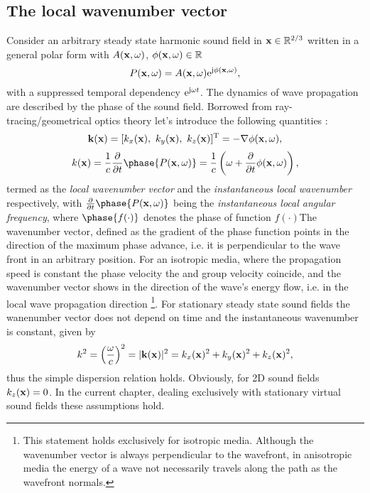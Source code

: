 \subsection{The local wavenumber vector}
Consider an arbitrary steady state harmonic sound field in $\mathbf{x} \in \mathbb{R}^{2/3}$ written in a general polar form with $A(\mathbf{x},\omega)$, $\phi(\mathbf{x},\omega) \in \mathbb{R}$
\begin{equation}
P(\mathbf{x},\omega) = A(\mathbf{x},\omega)\mathrm{e}^{\mathrm{j} \phi(\mathbf{x},\omega)},
\label{eq:25D_WFS:general_sf}
\end{equation}
with a suppressed temporal dependency $\mathrm{e}^{\mathrm{j} \omega t}$.
The dynamics of wave propagation are described by the phase of the sound field.
Borrowed from ray-tracing/geometrical optics theory let's introduce the following quantities \cite{Romer2005,Carozzi2004}:
\begin{equation}
\vk(\vx) = [k_x(\vx),\ k_y(\vx),\ k_z(\vx)]^{\mathrm{T}} = -\nabla \phi(\vx,\omega),
\end{equation}
\begin{equation}
k(\vx) =  \frac{1}{c} \frac{\partial}{\partial t} \phase{P(\vx,\omega)}  = \frac{1}{c} \left( \omega + \frac{\partial}{\partial t} \phi(\vx,\omega) \right),
\end{equation}
termed as the \emph{local wavenumber vector} and the \emph{instantaneous local wavenumber} respectively, with $ \frac{\partial}{\partial t} \phase{P(\vx,\omega)} $ being the \emph{instantaneous local angular frequency}, where $\phase{f(\cdot)}$ denotes the phase of function $f(\cdot)$The wavenumber vector, defined as the gradient of the phase function points in the direction of the maximum phase advance, i.e. it is perpendicular to the wave front in an arbitrary position. For an isotropic media, where the propagation speed is constant the phase velocity the and group velocity coincide, and the wavenumber vector shows in the direction of the wave's energy flow, i.e. in the local wave propagation direction \footnote{This statement holds exclusively for isotropic media. Although the wavenumber vector is always perpendicular to the wavefront, in anisotropic media the energy of a wave not necessarily travels along the path as the wavefront normals\cite{Pollard1977}.}.
For stationary steady state sound fields the wanenumber vector does not depend on time and the instantaneous wavenumber is constant, given by 
\begin{equation}
k^2 = \left( \frac{\omega}{c} \right)^2 = |\mathbf{k}(\mathbf{x})|^2 = k_x(\mathbf{x})^2 + k_y(\mathbf{x})^2 + k_z(\mathbf{x})^2,
\end{equation}
thus the simple dispersion relation holds. Obviously, for 2D sound fields $k_z(\mathbf{x})=0$. In the current chapter, dealing exclusively with stationary virtual sound fields these assumptions hold.

